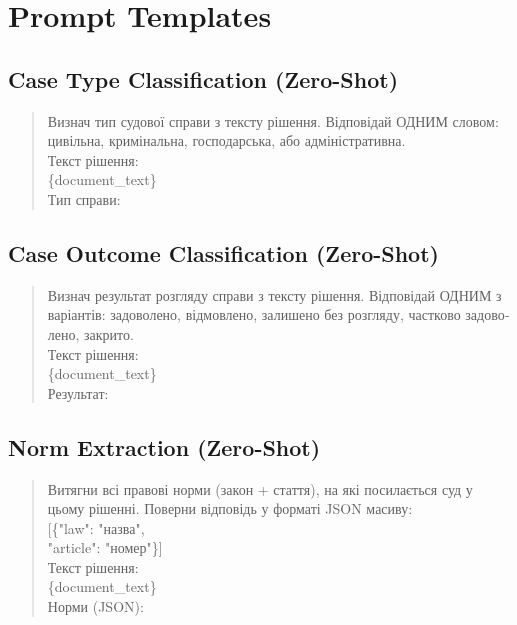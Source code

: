 \documentclass[11pt,a4paper]{article}
\begin{document}
\appendix

\section{Prompt Templates}
\label{app:prompts}

\subsection{Case Type Classification (Zero-Shot)}

\begin{quote}\small\ttfamily
\foreignlanguage{ukrainian}{Визнач тип судової справи з тексту рішення.
Відповідай ОДНИМ словом: цивільна, кримінальна,
господарська, або адміністративна.}\\[6pt]
\foreignlanguage{ukrainian}{Текст рішення:}\\
\{document\_text\}\\[6pt]
\foreignlanguage{ukrainian}{Тип справи:}
\end{quote}

\subsection{Case Outcome Classification (Zero-Shot)}

\begin{quote}\small\ttfamily
\foreignlanguage{ukrainian}{Визнач результат розгляду справи з тексту рішення.
Відповідай ОДНИМ з варіантів: задоволено, відмовлено,
залишено без розгляду, частково задоволено, закрито.}\\[6pt]
\foreignlanguage{ukrainian}{Текст рішення:}\\
\{document\_text\}\\[6pt]
\foreignlanguage{ukrainian}{Результат:}
\end{quote}

\subsection{Norm Extraction (Zero-Shot)}

\begin{quote}\small\ttfamily
\foreignlanguage{ukrainian}{Витягни всі правові норми (закон + стаття),
на які посилається суд у цьому рішенні.
Поверни відповідь у форматі JSON масиву:}\\
{[}\{"law": "\foreignlanguage{ukrainian}{назва}",\\
\hspace*{1em}"article": "\foreignlanguage{ukrainian}{номер}"\}{]}\\[6pt]
\foreignlanguage{ukrainian}{Текст рішення:}\\
\{document\_text\}\\[6pt]
\foreignlanguage{ukrainian}{Норми (JSON):}
\end{quote}
\end{document}

